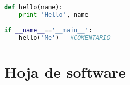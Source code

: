 \documentclass[12pt]{article}  %
\begin{document}
\begin{lstlisting}[language=Python, caption=Código en Python]
  def hello(name):
    print 'Hello', name
 
if __name__=='__main__':
    hello('Me')   #COMENTARIO 
\end{lstlisting}


\newpage %
\appendix %
\section{Hoja de software}


\clearpage %
\end{document}

